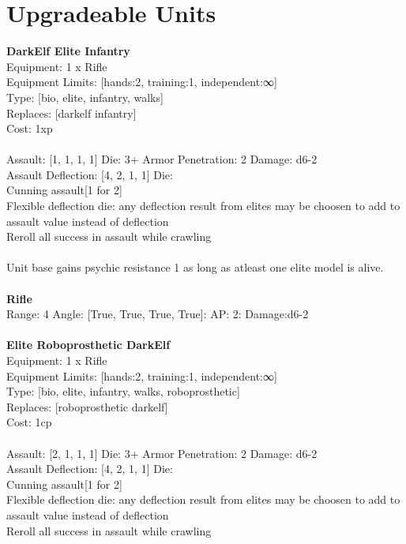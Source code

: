 \pagebreak\section{Upgradeable Units}{\bf DarkElf Elite Infantry } \\
Equipment: 1 x Rifle \\
Equipment Limits: [hands:2, training:1, independent:∞] \\
Type: [bio, elite, infantry, walks] \\
Replaces: [darkelf infantry] \\
Cost: 1xp\\
\ \\
Assault: [1, 1, 1, 1] Die: 3+ Armor Penetration: 2 Damage: d6-2 \\
Assault Deflection: [4, 2, 1, 1] Die: \\
\indent Cunning assault[1 for 2]\\ 
Flexible deflection die: any deflection result from elites may be choosen to add to assault value instead of deflection\\ 
Reroll all success in assault while crawling\\ 
 
\ \\
Unit base gains psychic resistance 1 as long as atleast one elite model is alive.\\ 

\ \\
{\bf Rifle } \\



Range: 4  Angle: [True, True, True, True]: AP: 2: Damage:d6-2 \\




 
\ \\

{\bf Elite Roboprosthetic DarkElf } \\
Equipment: 1 x Rifle \\
Equipment Limits: [hands:2, training:1, independent:∞] \\
Type: [bio, elite, infantry, walks, roboprosthetic] \\
Replaces: [roboprosthetic darkelf] \\
Cost: 1cp\\
\ \\
Assault: [2, 1, 1, 1] Die: 3+ Armor Penetration: 2 Damage: d6-2 \\
Assault Deflection: [4, 2, 1, 1] Die: \\
\indent Cunning assault[1 for 2]\\ 
Flexible deflection die: any deflection result from elites may be choosen to add to assault value instead of deflection\\ 
Reroll all success in assault while crawling\\ 
 
